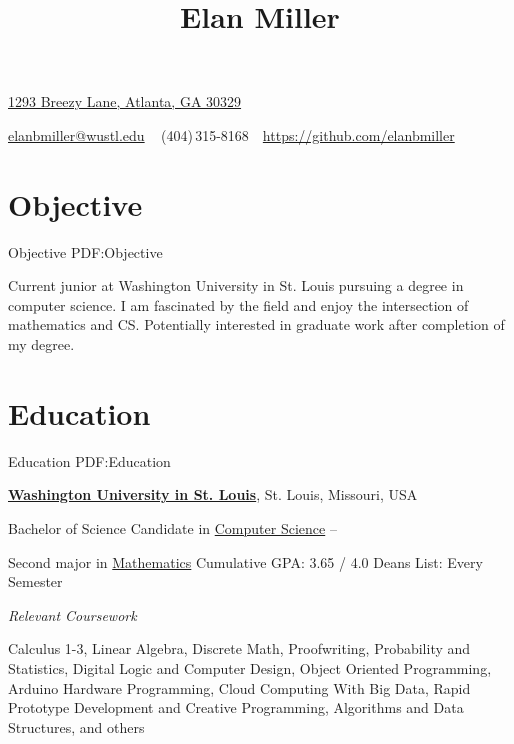 \documentclass[letterpaper,10pt,oneside]{article}
\newcommand{\CVWebpage}{https://github.com/elanbmiller}
\begin{document}

\title{Elan Miller}

\begin{subtitle}
\href{}
{1293 Breezy Lane, Atlanta, GA 30329}
\par
\href{mailto:elanbmiller@wustl.edu}
{elanbmiller@wustl.edu}
\,\SubBulletSymbol\,
\,(404)\,315-8168
\,\SubBulletSymbol\,
\href{\CVWebpage}
{\CVWebpage}
\end{subtitle}

\begin{body}


\section{Objective}
{Objective}
{PDF:Objective}

Current junior at Washington University in St. Louis pursuing a degree in computer science. I am fascinated by the field and enjoy the intersection of mathematics and CS. Potentially interested in graduate work after completion of my degree.


\section
{Education}
{Education}
{PDF:Education}

\href{http://engineering.wustl.edu/Pages/home.aspx}
{\textbf{Washington University in St. Louis}},
St. Louis, Missouri, USA

\GapNoBreak
\BulletItem
Bachelor of Science Candidate in
\href{http://cse.wustl.edu/Pages/default.aspx}
{Computer Science}
\hfill
{} --
\begin{detail}
Second major in \href{http://wumath.wustl.edu}{Mathematics}
\SubBulletItem
Cumulative GPA: 3.65 / 4.0
\SubBulletItem
Deans List: Every Semester
\end{detail}


\BigGap

\textit{Relevant Coursework}
\par
Calculus 1-3, Linear Algebra, Discrete Math, Proofwriting, Probability and Statistics, Digital Logic and Computer Design, Object Oriented Programming, Arduino Hardware Programming, Cloud Computing With Big Data, Rapid Prototype Development and Creative Programming, Algorithms and Data Structures, and others


\end{body}
\end{document}
